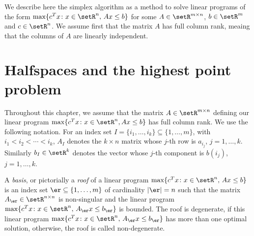 

We describe here the simplex algorithm as a method to solve linear
programs of the form $\max\{c^Tx \colon x \in \setR^n, \, Ax\leq b\}$ for some $A
\in \setR^{m\times n}$, $b \in \setR^m$ and $c \in \setR^n$. We assume first that the
matrix $A$ has full column rank, meaing that the columns of $A$ are
linearly independent.

\section{Halfspaces and the highest point problem}
\label{sec:two-variable-linear}



Throughout this chapter, we assume that the matrix $A \in \setR^{m\times n}$
defining our linear program $\max\{c^Tx \colon x \in \setR^n, Ax\leq b\}$ has
full column rank. We use the following notation.  For an index set
$I=\{i_1,\ldots,i_k\}\subseteq\{1,\ldots,m\}$, with $i_1<i_2<\cdots<i_k$, $A_I$ denotes
the $k\times n$ matrix whose $j$-th row is $a_{i_j}$, $j=1,\ldots,k$. Similarly
$b_I\in \setR^k$ denotes the vector whose $j$-th component is $b(i_j)$, $j=1,\ldots,k$. 

\begin{definition}
  \label{def:6}
  A \emph{basis}, or pictorially a \emph{roof} of a linear program
  $\max\{c^Tx \colon x \in \setR^n, \, Ax\leq b\}$ is an index set $\er
  \subseteq\{1,\ldots,m\}$ of cardinality $|\er| = n$ such that the matrix
  $A_\er\in \setR^{n\times n}$ is non-singular and the linear program
  $\max\{c^Tx \colon x \in \setR^n,\,  A_\er x\leq b_\er\}$ is bounded. The roof
  is degenerate, if this linear program
  $\max\{c^Tx\colon x\in\setR^n,\,A_\er x\leq b_\er\}$  has more than one optimal
  solution, otherwise, the roof is called non-degenerate. 
\end{definition}



